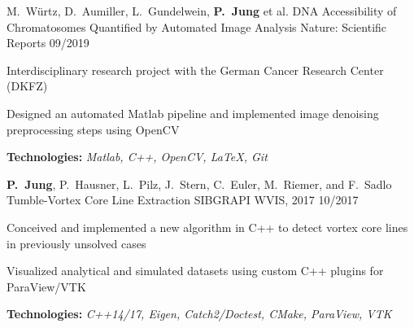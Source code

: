 \begin{cventries}
  \cventry
    {M.~Würtz, D.~Aumiller, L.~Gundelwein, \textbf{P.~Jung} et al.}
    {DNA Accessibility of Chromatosomes Quantified by Automated Image Analysis}
    {Nature: Scientific Reports}
    {09/2019}
    {
      \begin{cvitems}
        \item {Interdisciplinary research project with the German Cancer Research Center (DKFZ)}
        \item {Designed an automated Matlab pipeline and implemented image denoising preprocessing steps using OpenCV}
        \item {\textbf{Technologies:} \textit{Matlab, C++, OpenCV, \LaTeX, Git}}
      \end{cvitems}
    }
  \cventry
    {\textbf{P.~Jung}, P.~Hausner, L.~Pilz, J.~Stern, C.~Euler, M.~Riemer, and F.~Sadlo}
    {Tumble-Vortex Core Line Extraction}
    {SIBGRAPI WVIS, 2017}
    {10/2017}
    {
      \begin{cvitems}
        \item {Conceived and implemented a new algorithm in C++ to detect vortex core lines in previously unsolved cases}
        \item {Visualized analytical and simulated datasets using custom C++ plugins for ParaView/VTK}
        \item {\textbf{Technologies:} \textit{C++14/17, Eigen, Catch2/Doctest, CMake, ParaView, VTK}}
      \end{cvitems}
    }
\end{cventries}
